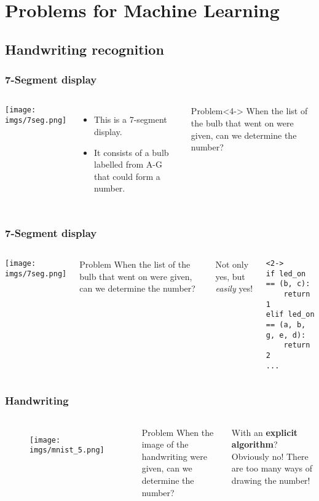 \documentclass[aspectratio=169]{beamer}
\begin{document}
\section{Problems for Machine Learning}

\subsection{Handwriting recognition}

\begin{frame}
	\frametitle{7-Segment display}
	\begin{columns}
		\texttt{[image: imgs/7seg.png]}
		\begin{itemize}
			\item<2-> This is a 7-segment display.
			\item<3-> It consists of a bulb labelled from A-G that could form a number.
		\end{itemize}
		\begin{block}{Problem}<4->
			When the list of the bulb that went on were given, can we determine the number?
		\end{block}
	\end{columns}
\end{frame}

\begin{frame}[fragile]
	\frametitle{7-Segment display}
	\begin{columns}
		\column{0.3\textwidth}
		\texttt{[image: imgs/7seg.png]}
		\column{0.7\textwidth}
		\begin{block}{Problem}
			When the list of the bulb that went on were given, can we determine the number?
		\end{block}
		 Not only yes, but \textit{easily} yes!
		\begin{lstlisting}<2->
if led_on == (b, c):
    return 1
elif led_on == (a, b, g, e, d):
    return 2
...
\end{lstlisting}
	\end{columns}
\end{frame}

\begin{frame}[fragile]
	\frametitle{Handwriting}
	\begin{columns}
		\begin{figure}
			\texttt{[image: imgs/mnist\_5.png]}
		\end{figure}
		\begin{block}{Problem}
			When the image of the handwriting were given, can we determine the number?
		\end{block}
		 With an \textbf{explicit algorithm}? Obviously no! There are too many ways of drawing the number!
	\end{columns}
\end{frame}
\end{document}
